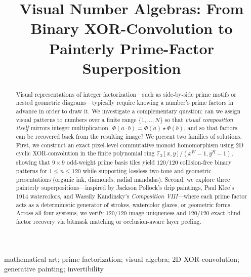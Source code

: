 \documentclass[]{interact}
\theoremstyle{plain}
\theoremstyle{definition}
\theoremstyle{remark}
\begin{document}

\title{Visual Number Algebras: From Binary XOR-Convolution to Painterly Prime-Factor Superposition}

\author{
}

\maketitle

\begin{abstract}
Visual representations of integer factorization—such as side-by-side prime motifs or nested geometric diagrams—typically require knowing a number's prime factors in advance in order to draw it. We investigate a complementary question: can we assign visual patterns to numbers over a finite range $\{1, \dots, N\}$ so that \emph{visual composition itself} mirrors integer multiplication, $\Phi(a \cdot b) = \Phi(a) \star \Phi(b)$, and so that factors can be recovered back from the resulting image? We present two families of solutions. First, we construct an exact pixel-level commutative monoid homomorphism using 2D cyclic XOR-convolution in the finite polynomial ring $\mathbb{F}_2[x,y]/(x^W - 1, y^H - 1)$, showing that $9 \times 9$ odd-weight prime basis tiles yield $120/120$ collision-free binary patterns for $1 \le n \le 120$ while supporting lossless two-tone and geometric presentations (organic ink, diamonds, radial mandalas). Second, we explore three painterly superpositions—inspired by Jackson Pollock's drip paintings, Paul Klee's 1914 watercolors, and Wassily Kandinsky's \emph{Composition VIII}—where each prime factor acts as a deterministic generator of strokes, watercolor glazes, or geometric forms. Across all four systems, we verify $120/120$ image uniqueness and $120/120$ exact blind factor recovery via bitmask matching or occlusion-aware layer peeling.
\end{abstract}

\begin{keywords}
mathematical art; prime factorization; visual algebra; 2D XOR-convolution; generative painting; invertibility
\end{keywords}
\end{document}
